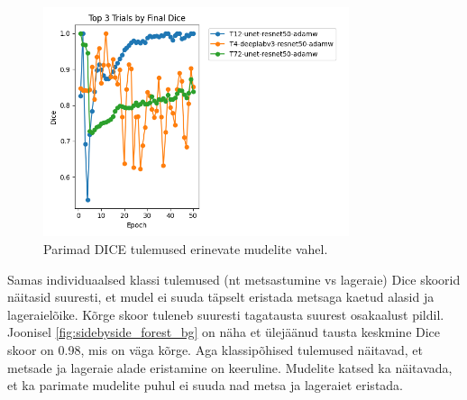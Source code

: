 \begin{figure}[H]
    \centering
    \includegraphics[width=0.8\textwidth]{figures/top3_dice.png}
    \caption{Parimad DICE tulemused erinevate mudelite vahel.}
    \label{fig:segmentation_results}
\end{figure}

Samas individuaalsed klassi tulemused (nt metsastumine vs lageraie) Dice skoorid näitasid suuresti, et mudel ei suuda
täpselt eristada metsaga kaetud alasid ja lageraielõike. Kõrge skoor tuleneb suuresti tagatausta suurest osakaalust pildil. Joonisel \ref{fig:sidebyside_forest_bg} on näha et ülejäänud tausta keskmine Dice skoor on 0.98, mis on väga kõrge. Aga klassipõhised tulemused näitavad, et metsade ja lageraie alade eristamine on keeruline. Mudelite katsed ka näitavada, et ka parimate mudelite puhul ei suuda nad metsa ja lageraiet eristada.

